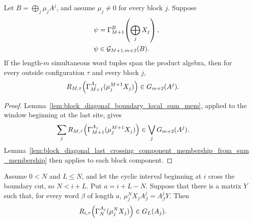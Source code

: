 \begin{lemma}
    \label{lem:block_diagonal_last_crossing_component_membership_from_chain_ground_space}
    \leanok
    Let $B=\bigoplus_j\mu_jA^j$, and assume $\mu_j\ne0$ for every block
    $j$. Suppose
    \begin{align}
        \psi
         & =
        \Gamma_{M+1}^{B}\!\left(\bigoplus_jX_j\right),
        \notag \\
        \psi
         & \in
        \mathcal G_{M+1,m+2}(B).
        \notag
    \end{align}
    If the length-$m$ simultaneous word tuples span the product algebra, then
    for every outside configuration $\tau$ and every block $j$,
    \begin{align}
        R_{M,\tau}\!\left(\Gamma_{M+1}^{A_j}(\mu_j^{M+1}X_j)\right)
         & \in
        G_{m+2}(A^j).
        \notag
    \end{align}
\end{lemma}

\begin{proof}
    \leanok
    Lemma~\ref{lem:block_diagonal_boundary_local_sum_mem}, applied to the
    window beginning at the last site, gives
    \begin{align}
        \sum_j
        R_{M,\tau}\!\left(\Gamma_{M+1}^{A_j}(\mu_j^{M+1}X_j)\right)
         & \in
        \bigvee_j G_{m+2}(A^j).
        \notag
    \end{align}
    Lemma~\ref{lem:block_diagonal_last_crossing_component_membership_from_sum_membership}
    then applies to each block component.
\end{proof}

\begin{lemma}
    \label{lem:block_diagonal_boundary_crossing_right_boundary_matrix}
    \leanok
    Assume $0<N$ and $L\le N$, and let the cyclic interval beginning at $i$
    cross the boundary cut, so $N<i+L$. Put $a=i+L-N$. Suppose that there is
    a matrix $Y$ such that, for every word $\beta$ of length $a$,
    $\mu_j^N X_j A^j_\beta = A^j_\beta Y$.
    Then
    \begin{align}
        R_{i,\tau}\!\left(\Gamma_N^{A_j}(\mu_j^NX_j)\right)
         & \in
        G_L(A_j).
        \notag
    \end{align}
\end{lemma}

